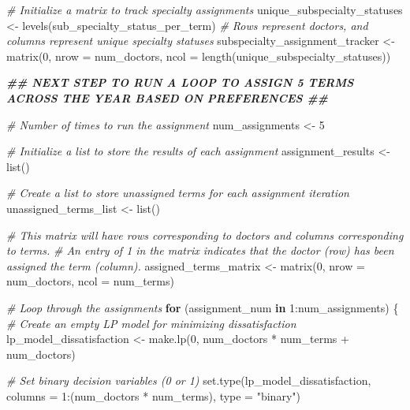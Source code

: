 \documentclass[
]{article}
\newenvironment{Shaded}{\begin{snugshade}}{\end{snugshade}}
\newcommand{\AttributeTok}[1]{\textcolor[rgb]{0.77,0.63,0.00}{#1}}
\newcommand{\CommentTok}[1]{\textcolor[rgb]{0.56,0.35,0.01}{\textit{#1}}}
\newcommand{\ControlFlowTok}[1]{\textcolor[rgb]{0.13,0.29,0.53}{\textbf{#1}}}
\newcommand{\DecValTok}[1]{\textcolor[rgb]{0.00,0.00,0.81}{#1}}
\newcommand{\DocumentationTok}[1]{\textcolor[rgb]{0.56,0.35,0.01}{\textbf{\textit{#1}}}}
\newcommand{\FunctionTok}[1]{\textcolor[rgb]{0.00,0.00,0.00}{#1}}
\newcommand{\NormalTok}[1]{#1}
\newcommand{\OtherTok}[1]{\textcolor[rgb]{0.56,0.35,0.01}{#1}}
\newcommand{\SpecialCharTok}[1]{\textcolor[rgb]{0.00,0.00,0.00}{#1}}
\newcommand{\StringTok}[1]{\textcolor[rgb]{0.31,0.60,0.02}{#1}}
\begin{document}
\begin{Shaded}
\begin{Highlighting}[]
\CommentTok{\# Initialize a matrix to track specialty assignments}
\NormalTok{unique\_subspecialty\_statuses }\OtherTok{\textless{}{-}} \FunctionTok{levels}\NormalTok{(sub\_specialty\_status\_per\_term)}
\CommentTok{\# Rows represent doctors, and columns represent unique specialty statuses}
\NormalTok{subspecialty\_assignment\_tracker }\OtherTok{\textless{}{-}} \FunctionTok{matrix}\NormalTok{(}\DecValTok{0}\NormalTok{, }\AttributeTok{nrow =}\NormalTok{ num\_doctors, }\AttributeTok{ncol =} \FunctionTok{length}\NormalTok{(unique\_subspecialty\_statuses))}

\DocumentationTok{\#\# NEXT STEP TO RUN A LOOP TO ASSIGN 5 TERMS ACROSS THE YEAR BASED ON PREFERENCES \#\#}

\CommentTok{\# Number of times to run the assignment}
\NormalTok{num\_assignments }\OtherTok{\textless{}{-}} \DecValTok{5}

\CommentTok{\# Initialize a list to store the results of each assignment}
\NormalTok{assignment\_results }\OtherTok{\textless{}{-}} \FunctionTok{list}\NormalTok{()}

\CommentTok{\# Create a list to store unassigned terms for each assignment iteration}
\NormalTok{unassigned\_terms\_list }\OtherTok{\textless{}{-}} \FunctionTok{list}\NormalTok{()}

\CommentTok{\# This matrix will have rows corresponding to doctors and columns corresponding to terms.}
\CommentTok{\# An entry of 1 in the matrix indicates that the doctor (row) has been assigned the term (column).}
\NormalTok{assigned\_terms\_matrix }\OtherTok{\textless{}{-}} \FunctionTok{matrix}\NormalTok{(}\DecValTok{0}\NormalTok{, }\AttributeTok{nrow =}\NormalTok{ num\_doctors, }\AttributeTok{ncol =}\NormalTok{ num\_terms)}

\CommentTok{\# Loop through the assignments}
\ControlFlowTok{for}\NormalTok{ (assignment\_num }\ControlFlowTok{in} \DecValTok{1}\SpecialCharTok{:}\NormalTok{num\_assignments) \{}
    \CommentTok{\# Create an empty LP model for minimizing dissatisfaction}
\NormalTok{    lp\_model\_dissatisfaction }\OtherTok{\textless{}{-}} \FunctionTok{make.lp}\NormalTok{(}\DecValTok{0}\NormalTok{, num\_doctors }\SpecialCharTok{*}\NormalTok{ num\_terms }\SpecialCharTok{+}\NormalTok{ num\_doctors)}

    \CommentTok{\# Set binary decision variables (0 or 1)}
    \FunctionTok{set.type}\NormalTok{(lp\_model\_dissatisfaction, }\AttributeTok{columns =} \DecValTok{1}\SpecialCharTok{:}\NormalTok{(num\_doctors }\SpecialCharTok{*}\NormalTok{ num\_terms), }\AttributeTok{type =} \StringTok{"binary"}\NormalTok{)}


\end{Highlighting}
\end{Shaded}
\end{document}
